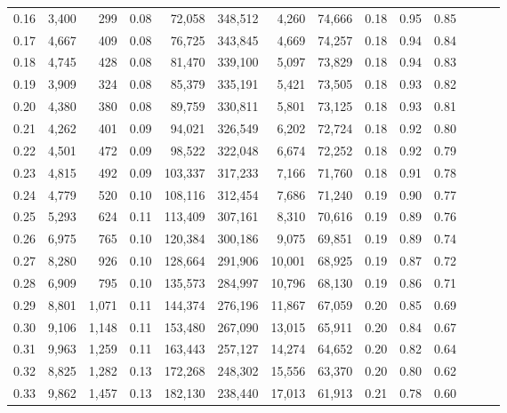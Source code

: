 \begin{tabular}{rrrrrrrrrrrrrr}
0.16 &   3,400 &    299 &  0.08 &   72,058 &  348,512 &   4,260 &  74,666 &  0.18 &  0.95 &      0.85 \\
0.17 &   4,667 &    409 &  0.08 &   76,725 &  343,845 &   4,669 &  74,257 &  0.18 &  0.94 &      0.84 \\
0.18 &   4,745 &    428 &  0.08 &   81,470 &  339,100 &   5,097 &  73,829 &  0.18 &  0.94 &      0.83 \\
0.19 &   3,909 &    324 &  0.08 &   85,379 &  335,191 &   5,421 &  73,505 &  0.18 &  0.93 &      0.82 \\
0.20 &   4,380 &    380 &  0.08 &   89,759 &  330,811 &   5,801 &  73,125 &  0.18 &  0.93 &      0.81 \\
0.21 &   4,262 &    401 &  0.09 &   94,021 &  326,549 &   6,202 &  72,724 &  0.18 &  0.92 &      0.80 \\
0.22 &   4,501 &    472 &  0.09 &   98,522 &  322,048 &   6,674 &  72,252 &  0.18 &  0.92 &      0.79 \\
0.23 &   4,815 &    492 &  0.09 &  103,337 &  317,233 &   7,166 &  71,760 &  0.18 &  0.91 &      0.78 \\
0.24 &   4,779 &    520 &  0.10 &  108,116 &  312,454 &   7,686 &  71,240 &  0.19 &  0.90 &      0.77 \\
0.25 &   5,293 &    624 &  0.11 &  113,409 &  307,161 &   8,310 &  70,616 &  0.19 &  0.89 &      0.76 \\
0.26 &   6,975 &    765 &  0.10 &  120,384 &  300,186 &   9,075 &  69,851 &  0.19 &  0.89 &      0.74 \\
0.27 &   8,280 &    926 &  0.10 &  128,664 &  291,906 &  10,001 &  68,925 &  0.19 &  0.87 &      0.72 \\
0.28 &   6,909 &    795 &  0.10 &  135,573 &  284,997 &  10,796 &  68,130 &  0.19 &  0.86 &      0.71 \\
0.29 &   8,801 &  1,071 &  0.11 &  144,374 &  276,196 &  11,867 &  67,059 &  0.20 &  0.85 &      0.69 \\
0.30 &   9,106 &  1,148 &  0.11 &  153,480 &  267,090 &  13,015 &  65,911 &  0.20 &  0.84 &      0.67 \\
0.31 &   9,963 &  1,259 &  0.11 &  163,443 &  257,127 &  14,274 &  64,652 &  0.20 &  0.82 &      0.64 \\
0.32 &   8,825 &  1,282 &  0.13 &  172,268 &  248,302 &  15,556 &  63,370 &  0.20 &  0.80 &      0.62 \\
0.33 &   9,862 &  1,457 &  0.13 &  182,130 &  238,440 &  17,013 &  61,913 &  0.21 &  0.78 &      0.60 \\

\end{tabular}
